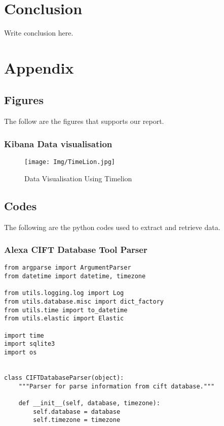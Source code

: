 \documentclass{easychair}
\begin{document}
\begin{enumerate}
\section{Conclusion}
\label{sect:conclusion} Write conclusion here.



\section{Appendix}

\subsection{Figures}
The follow are the figures that supports our report.
\subsubsection{Kibana Data visualisation}
\begin{figure}[h]
    \centering
    \texttt{[image: Img/TimeLion.jpg]}
    \caption{Data Visualisation Using Timelion}
    \label{fig:Drug Lab}
\end{figure}

\subsection{Codes}
The following are the python codes used to extract and retrieve data.
\subsubsection{Alexa CIFT Database Tool Parser}


\lstset{language=Python}
\lstset{frame=lines}
\lstset{basicstyle=\footnotesize}
\begin{lstlisting}
from argparse import ArgumentParser
from datetime import datetime, timezone

from utils.logging.log import Log
from utils.database.misc import dict_factory
from utils.time import to_datetime
from utils.elastic import Elastic

import time
import sqlite3
import os


class CIFTDatabaseParser(object):
    """Parser for parse information from cift database."""

    def __init__(self, database, timezone):
        self.database = database
        self.timezone = timezone


\end{lstlisting}
\end{enumerate}
\end{document}
